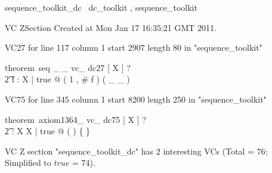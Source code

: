 \documentclass{article}
\begin{document}

\begin{zsection}
	 \SECTION sequence\_toolkit\_dc \parents~dc\_toolkit , sequence\_toolkit
\end{zsection}

\newcommand{\appliesTo}{\zbinop{appliesTo}} 
\newcommand{\appliesToNofix}{\zpreop{appliesToNofix}} 

VC ZSection Created at Mon Jan 17 16:35:21 GMT 2011.

VC27 for line 117 column 1 start 2907 length 80 in "sequence_toolkit"
\begin{zed}
theorem~seq \_  \_ vc\_ dc27 [ X ] \vdash ? \\
   \t2 \forall f : \nat \ffun X | true @ ( 1 , \# f ) \in \dom ( \_ \upto \_ )
\end{zed}

VC75 for line 345 column 1 start 8200 length 250 in "sequence_toolkit"
\begin{zed}
theorem~axiom1364\_ vc\_ dc75 [ X ] \vdash ? \\
   \t2 \forall \dcat : \seq \seq X \fun \seq X | true @ ( \langle \listarg \rangle ) \appliesTo \{ \}
\end{zed}



 VC Z section "sequence_toolkit_dc" has $2$ interesting VCs (Total = 76; Simplified to $true$ = 74).



\end{document}
